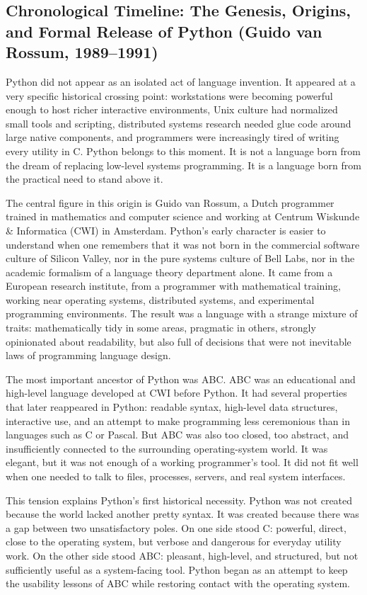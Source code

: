 \subsection{Chronological Timeline: The Genesis, Origins, and Formal Release of Python (Guido van Rossum, 1989--1991)}

Python did not appear as an isolated act of language invention. It appeared at a very specific historical crossing point: workstations were becoming powerful enough to host richer interactive environments, Unix culture had normalized small tools and scripting, distributed systems research needed glue code around large native components, and programmers were increasingly tired of writing every utility in C. Python belongs to this moment. It is not a language born from the dream of replacing low-level systems programming. It is a language born from the practical need to stand above it.

The central figure in this origin is Guido van Rossum, a Dutch programmer trained in mathematics and computer science and working at Centrum Wiskunde \& Informatica (CWI) in Amsterdam. Python's early character is easier to understand when one remembers that it was not born in the commercial software culture of Silicon Valley, nor in the pure systems culture of Bell Labs, nor in the academic formalism of a language theory department alone. It came from a European research institute, from a programmer with mathematical training, working near operating systems, distributed systems, and experimental programming environments. The result was a language with a strange mixture of traits: mathematically tidy in some areas, pragmatic in others, strongly opinionated about readability, but also full of decisions that were not inevitable laws of programming language design.

The most important ancestor of Python was ABC. ABC was an educational and high-level language developed at CWI before Python. It had several properties that later reappeared in Python: readable syntax, high-level data structures, interactive use, and an attempt to make programming less ceremonious than in languages such as C or Pascal. But ABC was also too closed, too abstract, and insufficiently connected to the surrounding operating-system world. It was elegant, but it was not enough of a working programmer's tool. It did not fit well when one needed to talk to files, processes, servers, and real system interfaces.

This tension explains Python's first historical necessity. Python was not created because the world lacked another pretty syntax. It was created because there was a gap between two unsatisfactory poles. On one side stood C: powerful, direct, close to the operating system, but verbose and dangerous for everyday utility work. On the other side stood ABC: pleasant, high-level, and structured, but not sufficiently useful as a system-facing tool. Python began as an attempt to keep the usability lessons of ABC while restoring contact with the operating system.

